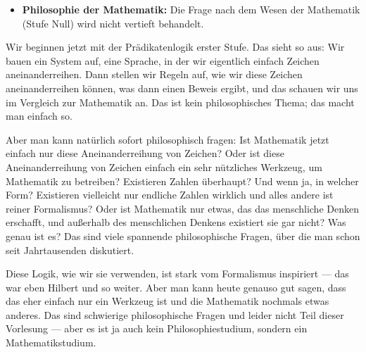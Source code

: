 \begin{math-stroke}
\begin{itemize}
    \item \textbf{Philosophie der Mathematik:} Die Frage nach dem Wesen der Mathematik (Stufe Null) wird nicht vertieft behandelt.
\end{itemize}
\end{math-stroke}

\begin{spoken-clean}[00:26:00 - 00:28:30]
Wir beginnen jetzt mit der Prädikatenlogik erster Stufe. Das sieht so aus: Wir bauen ein System auf, eine Sprache, in der wir eigentlich einfach Zeichen aneinanderreihen. Dann stellen wir Regeln auf, wie wir diese Zeichen aneinanderreihen können, was dann einen Beweis ergibt, und das schauen wir uns im Vergleich zur Mathematik an. Das ist kein philosophisches Thema; das macht man einfach so. 

Aber man kann natürlich sofort philosophisch fragen: Ist Mathematik jetzt einfach nur diese Aneinanderreihung von Zeichen? Oder ist diese Aneinanderreihung von Zeichen einfach ein sehr nützliches Werkzeug, um Mathematik zu betreiben? Existieren Zahlen überhaupt? Und wenn ja, in welcher Form? Existieren vielleicht nur endliche Zahlen wirklich und alles andere ist reiner Formalismus? Oder ist Mathematik nur etwas, das das menschliche Denken erschafft, und außerhalb des menschlichen Denkens existiert sie gar nicht? Was genau ist es? Das sind viele spannende philosophische Fragen, über die man schon seit Jahrtausenden diskutiert.

Diese Logik, wie wir sie verwenden, ist stark vom Formalismus inspiriert --- das war eben Hilbert und so weiter. Aber man kann heute genauso gut sagen, dass das eher einfach nur ein Werkzeug ist und die Mathematik nochmals etwas anderes. Das sind schwierige philosophische Fragen und leider nicht Teil dieser Vorlesung --- aber es ist ja auch kein Philosophiestudium, sondern ein Mathematikstudium.
\end{spoken-clean}

